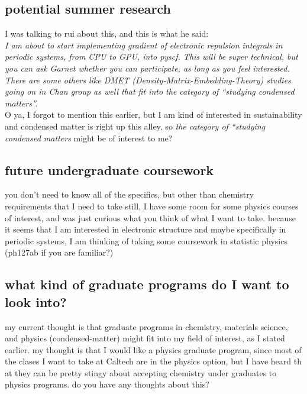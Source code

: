 \documentclass[12pt]{article}
\begin{document}
\subsection{potential summer research}
I was talking to rui about this, and this is what he said:\\
\textit{I am about to start implementing gradient of electronic repulsion integrals in periodic systems, from CPU to GPU, into pyscf. This will be super technical, but you can ask Garnet whether you can participate, as long as you feel interested. There are some others like DMET (Density-Matrix-Embedding-Theory) studies going on in Chan group as well that fit into the category of “studying condensed matters”. 
}\\
O ya, I forgot to mention this earlier, but I am kind of interested in sustainability and condensed matter is right up this alley, so \emph{the category of “studying condensed matters} might be of interest to me?
\subsection{future undergraduate coursework}
you don't need to know all of the specifics, but other than chemistry requirements that I need to take still, I have some room for some physics courses of interest, and was just curious what you think of what I want to take. because it seems that I am interested in electronic structure and maybe specifically in periodic systems, I am thinking of taking some coursework in statistic physics (ph127ab if you are familiar?)
\subsection{what kind of graduate programs do I want to look into?}
my current thought is that graduate programs in chemistry, materials science, and physics (condensed-matter) might fit into my field of interest, as I stated earlier. my thought is that I would like a physics graduate program, since most of the clases I want to take at Caltech are in the physics option, but I have heard th at they can be pretty stingy about accepting chemistry under graduates to physics programs. do you have any thoughts about this?
\end{document}
